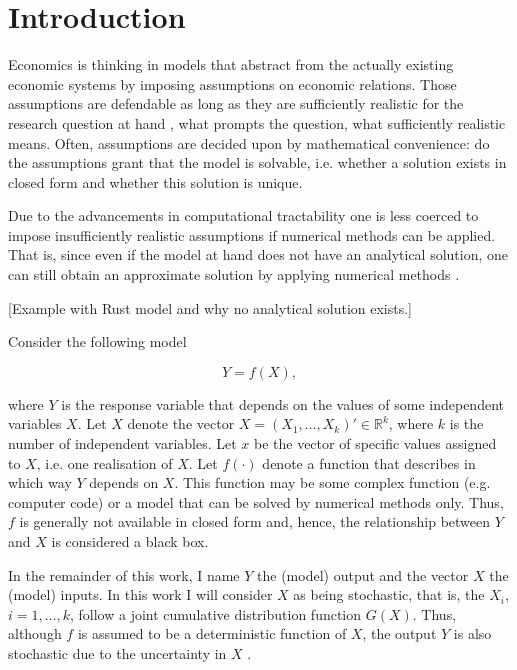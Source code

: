 \section{Introduction} \label{intro}

Economics is thinking in models that abstract from the actually existing economic systems by imposing assumptions on economic relations. Those assumptions are defendable as long as they are sufficiently realistic for the research question at hand \citep{F66}, what prompts the question, what sufficiently realistic means. Often, assumptions are decided upon by mathematical convenience: do the assumptions grant that the model is solvable, i.e. whether a solution exists in closed form and whether this solution is unique.

Due to the advancements in computational tractability one is less coerced to impose insufficiently realistic assumptions if numerical methods can be applied. That is, since even if the model at hand does not have an analytical solution, one can still obtain an approximate solution by applying numerical methods \citep{MF04}.

[Example with Rust model and why no analytical solution exists.]

\noindent Consider the following model

\begin{equation*}
Y = f(X),
\end{equation*}

where $Y$ is the response variable that depends on the values of some independent variables $X$. Let $X$ denote the vector $X = (X_1, \dots, X_k)' \in \mathbb{R}^k$, where $k$ is the number of independent variables. Let $x$ be the vector of specific values assigned to $X$, i.e. one realisation of $X$. Let $f(\cdot)$ denote a function that describes in which way $Y$ depends on $X$. This function may be some complex function (e.g. computer code) or a model that can be solved by numerical methods only. Thus, $f$ is generally not available in closed form and, hence, the relationship between $Y$ and $X$ is considered a black box.

In the remainder of this work, I name $Y$ the (model) output and the vector $X$ the (model) inputs. In this work I will consider $X$ as being stochastic, that is, the $X_i$, $i = 1,\dots, k$, follow a joint cumulative distribution function $G(X)$. Thus, although $f$ is assumed to be a deterministic function of $X$, the output $Y$ is also stochastic due to the uncertainty in $X$ \citep{SNS16}.


